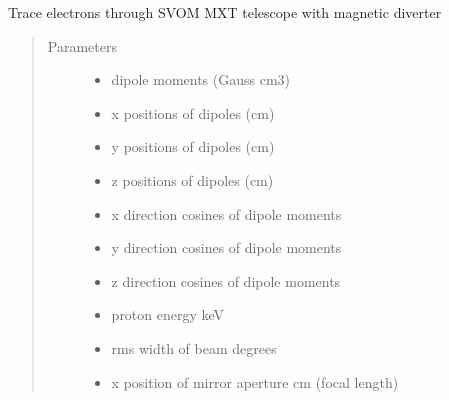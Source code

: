 \documentclass[letterpaper,10pt,english]{sphinxmanual}
\begin{document}

\begin{fulllineitems}
\label{\detokenize{xsrt_functions:xsrt.eltmxt}}
Trace electrons through SVOM MXT telescope with magnetic diverter
\begin{quote}\begin{description}
\item[{Parameters}] \leavevmode\begin{itemize}
\item {} 
 \textendash{} dipole moments (Gauss cm3)

\item {} 
 \textendash{} x positions of dipoles (cm)

\item {} 
 \textendash{} y positions of dipoles (cm)

\item {} 
 \textendash{} z positions of dipoles (cm)

\item {} 
 \textendash{} x direction cosines of dipole moments

\item {} 
 \textendash{} y direction cosines of dipole moments

\item {} 
 \textendash{} z direction cosines of dipole moments

\item {} 
 \textendash{} proton energy keV

\item {} 
 \textendash{} rms width of beam degrees

\item {} 
 \textendash{} x position of mirror aperture cm (focal length)


\end{itemize}
\end{description}
\end{quote}
\end{fulllineitems}
\end{document}
